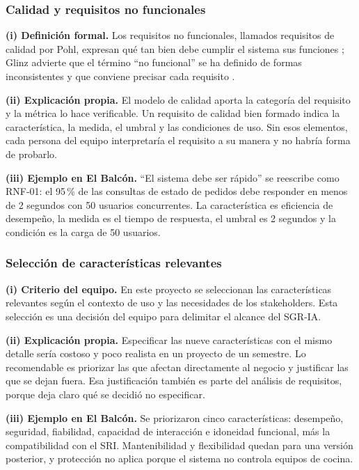 \subsubsection{Calidad y requisitos no funcionales}
\textbf{(i) Definici\'on formal.} Los requisitos no funcionales, llamados requisitos de calidad por Pohl, expresan qu\'e tan bien debe cumplir el sistema sus funciones \cite{pohl2025}; Glinz advierte que el t\'ermino ``no funcional'' se ha definido de formas inconsistentes y que conviene precisar cada requisito \cite{glinz2007}.\par
\textbf{(ii) Explicaci\'on propia.} El modelo de calidad aporta la categor\'ia del requisito y la m\'etrica lo hace verificable. Un requisito de calidad bien formado indica la caracter\'istica, la medida, el umbral y las condiciones de uso. Sin esos elementos, cada persona del equipo interpretar\'ia el requisito a su manera y no habr\'ia forma de probarlo.\par
\textbf{(iii) Ejemplo en El Balc\'on.} ``El sistema debe ser r\'apido'' se reescribe como RNF-01: el 95\,\% de las consultas de estado de pedidos debe responder en menos de 2 segundos con 50 usuarios concurrentes. La caracter\'istica es eficiencia de desempe\~no, la medida es el tiempo de respuesta, el umbral es 2 segundos y la condici\'on es la carga de 50 usuarios.\par

\subsubsection{Selecci\'on de caracter\'isticas relevantes}
\textbf{(i) Criterio del equipo.} En este proyecto se seleccionan las caracter\'isticas relevantes seg\'un el contexto de uso y las necesidades de los stakeholders. Esta selecci\'on es una decisi\'on del equipo para delimitar el alcance del SGR-IA.
\par
\textbf{(ii) Explicaci\'on propia.} Especificar las nueve caracter\'isticas con el mismo detalle ser\'ia costoso y poco realista en un proyecto de un semestre. Lo recomendable es priorizar las que afectan directamente al negocio y justificar las que se dejan fuera. Esa justificaci\'on tambi\'en es parte del an\'alisis de requisitos, porque deja claro qu\'e se decidi\'o no especificar.\par
\textbf{(iii) Ejemplo en El Balc\'on.} Se priorizaron cinco caracter\'isticas: desempe\~no, seguridad, fiabilidad, capacidad de interacci\'on e idoneidad funcional, m\'as la compatibilidad con el SRI. Mantenibilidad y flexibilidad quedan para una versi\'on posterior, y protecci\'on no aplica porque el sistema no controla equipos de cocina.\par
